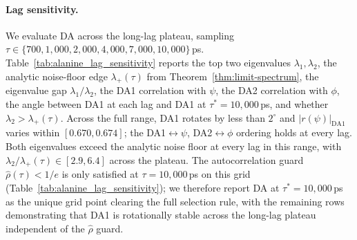 \documentclass{article}
\begin{document}
\paragraph{Lag sensitivity.}
We evaluate DA across the long-lag plateau, sampling
$\tau \in \{700, 1{,}000, 2{,}000, 4{,}000, 7{,}000, 10{,}000\}$\,ps.
Table~\ref{tab:alanine_lag_sensitivity} reports the top two eigenvalues
$\lambda_1, \lambda_2$, the analytic noise-floor edge
$\lambda_+(\tau)$ from Theorem~\ref{thm:limit-spectrum}, the
eigenvalue gap $\lambda_1/\lambda_2$, the DA1 correlation with $\psi$,
the DA2 correlation with $\phi$, the angle between DA1 at each lag
and DA1 at $\tau^* = 10{,}000$\,ps, and whether $\lambda_2 > \lambda_+(\tau)$.
Across the full range, DA1 rotates by less than $2^\circ$ and
$|r(\psi)|_{\mathrm{DA1}}$ varies within $[0.670, 0.674]$; the
DA1$\leftrightarrow\psi$, DA2$\leftrightarrow\phi$ ordering holds at
every lag. Both eigenvalues exceed the analytic noise floor at every
lag in this range, with $\lambda_2/\lambda_+(\tau) \in [2.9, 6.4]$
across the plateau. The autocorrelation guard $\hat\rho(\tau) < 1/e$
is only satisfied at $\tau = 10{,}000$\,ps on this grid
(Table~\ref{tab:alanine_lag_sensitivity}); we therefore report DA
at $\tau^* = 10{,}000$\,ps as the unique grid point clearing the full
selection rule, with the remaining rows demonstrating that DA1 is
rotationally stable across the long-lag plateau independent of the
$\hat\rho$ guard.
\end{document}
